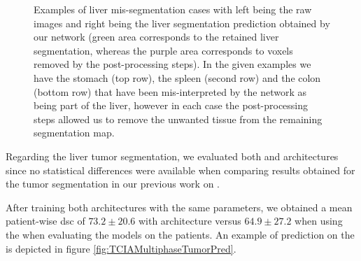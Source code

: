 \begin{figure}[ht!]
\begin{minipage}{0.45\linewidth}
	\end{minipage}
	\caption{Examples of liver mis-segmentation cases with left being the raw images and right being the liver segmentation prediction obtained by our  network (green area corresponds to the retained liver segmentation, whereas the purple area corresponds to voxels removed by the post-processing steps). In the given examples we have the stomach (top row), the spleen (second row) and the colon (bottom row) that have been mis-interpreted by the network as being part of the liver, however in each case the post-processing steps allowed us to remove the unwanted tissue from the remaining segmentation map.}
	\label{fig:LITS_networkMisSeg_otherOrgans}
\end{figure}

Regarding the liver tumor segmentation, we evaluated both  and 
architectures since no statistical differences were available when
comparing results obtained for the tumor segmentation in our previous
work on \textbf{} \cite{Ouhmich2019}.

After training both architectures with the same parameters, we obtained a mean patient-wise \ac{dsc} of $ 73.2 \pm 20.6 $ with 
architecture versus $ 64.9 \pm 27.2 $ when using the  when evaluating the
models on the \textbf{} patients. An example of prediction on the \textbf{} is
depicted in figure \ref{fig:TCIAMultiphaseTumorPred}. 

